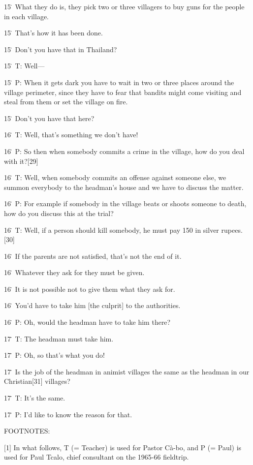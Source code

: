{15\. What they do is, they pick two or three villagers to buy guns for
the people in each village.}

{15\. That's how it has been done.}

{15\. Don't you have that in Thailand?}

{15\. T: Well---}

{15\. P: When it gets dark you have to wait in two or three places around
the village perimeter, since they have to fear that bandits might come visiting
and steal from them or set the village on fire.}

{15\. Don't you have that here?}

{16\. T: Well, that's something we don't have!}

{16\. P: So then when somebody commits a crime in the village, how do you
deal with it?[29]}

{16\. T: Well, when somebody commits an offense against someone else, we
summon everybody to the headman's house and we have to discuss the matter.}

{16\. P: For example if somebody in the village beats or shoots someone
to death, how do you discuss this at the trial?}

{16\. T: Well, if a person should kill somebody, he must pay 150 in silver
rupees.[30]}

{16\. If the parents are not satisfied, that's not the end of it.}

{16\. Whatever they ask for they must be given.}

{16\. It is not possible not to give them what they ask for.}

{16\. You'd have to take him [the culprit] to the authorities.}

{16\. P: Oh, would the headman have to take him there?}

{17\. T: The headman must take him.}

{17\. P: Oh, so that's what you do!}

{17\. Is the job of the headman in animist villages the same as the headman
in our Christian[31] villages?}

{17\. T: It's the same.}

{17\. P: I'd like to know the reason for that.}

{FOOTNOTES:}

{[1] In what follows, T (= Teacher) is used for Pastor Cà-bo, and P (=
Paul) is used for Paul Tcalo, chief consultant on the 1965-66 fieldtrip.}

